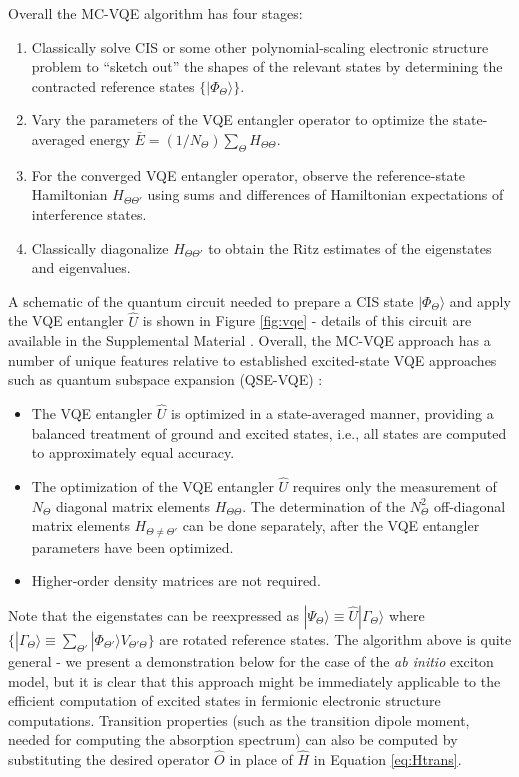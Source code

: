 \documentclass[aps,prl,twocolumn,showpacs,superscriptaddress,groupedaddress]{revtex4}  %
\begin{document}
Overall the MC-VQE algorithm has four stages:
\begin{enumerate}
\item Classically solve CIS or some other polynomial-scaling
electronic structure problem to ``sketch out'' the shapes of the relevant states by
determining the contracted reference states $\{ | \Phi_{\Theta} \rangle \}$.
\item Vary the parameters of the VQE entangler operator to optimize the
state-averaged energy $\bar E = (1/N_{\Theta}) \sum_{\Theta} H_{\Theta \Theta}$.
\item For the converged VQE entangler operator, observe the reference-state
Hamiltonian $H_{\Theta \Theta'}$ using sums and differences of Hamiltonian
expectations of interference states.
\item Classically diagonalize $H_{\Theta \Theta'}$ to obtain the Ritz estimates
of the eigenstates and eigenvalues.
\end{enumerate}
A schematic of the quantum circuit needed to prepare a CIS state
$|\Phi_{\Theta}\rangle$ and apply the VQE entangler $\hat U$ is shown in Figure
\ref{fig:vqe} - details of this circuit are available in the Supplemental
Material \cite{SuppNote}. Overall, the MC-VQE approach has a number of unique
features relative to established excited-state VQE approaches such as quantum
subspace expansion (QSE-VQE) \cite{McClean:2017:042308}:
\begin{itemize}
\item The VQE entangler $\hat U$ is optimized in a state-averaged manner,
providing a balanced treatment of ground and excited states, i.e., all states
are computed to approximately equal accuracy.
\item The optimization of the VQE entangler $\hat U$ requires only the
measurement of $N_{\Theta}$
diagonal matrix elements $H_{\Theta \Theta}$. The determination of the
$N_{\Theta}^2$ off-diagonal matrix elements $H_{\Theta \neq \Theta'}$ can be
done separately, after the VQE entangler parameters have been optimized.
\item Higher-order density matrices are not required. 
\end{itemize}

Note that the eigenstates can be reexpressed as
$
| \Psi_{\Theta} \rangle
\equiv
\hat U
| \Gamma_{\Theta} \rangle
$
where $\{ |\Gamma_{\Theta} \rangle \equiv \sum_{\Theta'} | \Phi_{\Theta'}
\rangle V_{\Theta' \Theta}  \}$ are rotated reference states.  The algorithm
above is quite general - we present a demonstration below for the case of the
\emph{ab initio} exciton model, but it is clear that this approach might be
immediately applicable to the efficient computation of excited states in
fermionic electronic structure computations.  Transition properties (such as the
transition dipole moment, needed for computing the absorption spectrum) can also
be computed by substituting the desired operator $\hat O$ in place of $\hat H$
in Equation \ref{eq:Htrans}.
\end{document}
